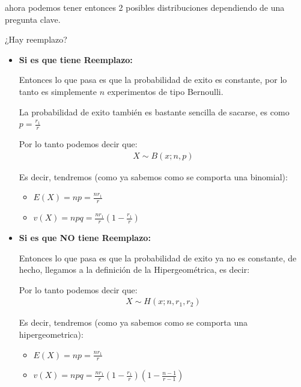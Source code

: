 \documentclass[12pt, fleqn]{report}                             %
\theoremstyle{break}                                            %
\newcommand{\Wrap}[1]{\left( #1 \right)}                        %
\begin{document}
                ahora podemos tener
                entonces 2 posibles distribuciones dependiendo de una pregunta clave.

                ¿Hay reemplazo?

                \begin{itemize}
                    \item 
                        \textbf{Si es que tiene Reemplazo:}

                        Entonces lo que pasa es que la probabilidad de exito es constante, por 
                        lo tanto es simplemente $n$ experimentos de tipo Bernoulli.

                        La probabilidad de exito también es bastante sencilla de sacarse, es
                        como $p = \frac{r_1}{r}$

                        Por lo tanto podemos decir que:
                        \begin{align*}
                            X \sim B(x; n, p)
                        \end{align*}

                        Es decir, tendremos (como ya sabemos como se comporta una binomial):
                        \begin{itemize}
                            \item $E(X) = np = \frac{nr_1}{r}$
                            \item $v(X) = npq = \frac{nr_1}{r}\Wrap{1 - \frac{r_1}{r}}$
                        \end{itemize}

                    \item 
                        \textbf{Si es que NO tiene Reemplazo:}

                        Entonces lo que pasa es que la probabilidad de exito ya no es constante,
                        de hecho, llegamos a la definición de la Hipergeométrica, es decir:

                        Por lo tanto podemos decir que:
                        \begin{align*}
                            X \sim H(x; n, r_1, r_2)
                        \end{align*}

                        Es decir, tendremos (como ya sabemos como se comporta una hipergeometrica):
                        \begin{itemize}
                            \item $E(X) = np = \frac{nr_1}{r}$
                            \item $v(X) = npq = \frac{nr_1}{r}\Wrap{1 - \frac{r_1}{r}}\Wrap{1 - \frac{n-1}{r-1}}$
                        \end{itemize}

                \end{itemize}
\end{document}
